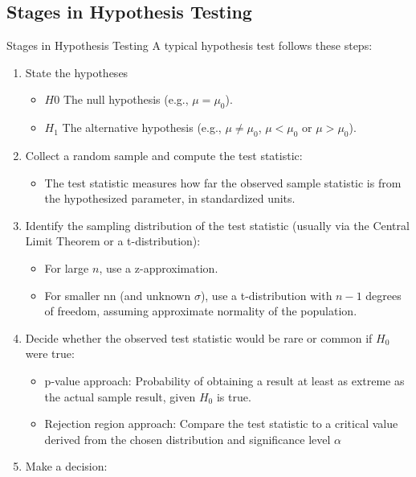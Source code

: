 \documentclass[10pt]{extarticle}
\begin{document}
\subsection{Stages in Hypothesis Testing}
\begin{conceptbox}{Stages in Hypothesis Testing}{}
    A typical hypothesis test follows these steps:
    \begin{enumerate}
        \item State the hypotheses
        \begin{itemize}
            \item $H0$ The null hypothesis (e.g., $\mu = \mu_0$).
            \item $H_1$ The alternative hypothesis (e.g., $\mu \neq \mu_0$, $\mu < \mu_0$ or $\mu > \mu_0$).
        \end{itemize}
    \item  Collect a random sample and compute the test statistic:
        \begin{itemize}
            \item The test statistic measures how far the observed sample statistic is from the hypothesized parameter, in standardized units.
        \end{itemize}
    \item Identify the sampling distribution of the test statistic (usually via the Central Limit Theorem or a t-distribution):
    \begin{itemize}
        \item For large $n$, use a z-approximation.
        \item For smaller nn (and unknown $\sigma$), use a t-distribution with $n-1$ degrees of freedom, assuming approximate normality of the population.
    \end{itemize}
    \item Decide whether the observed test statistic would be rare or common if $H_0$ were true:
    \begin{itemize}
        \item p-value approach: Probability of obtaining a result at least as extreme as the actual sample result, given $H_0$ is true.
        \item Rejection region approach: Compare the test statistic to a critical value derived from the chosen distribution and significance level $\alpha$
    \end{itemize}
    \item  Make a decision:
    \begin{itemize}

\end{itemize}
\end{enumerate}
\end{conceptbox}
\end{document}

